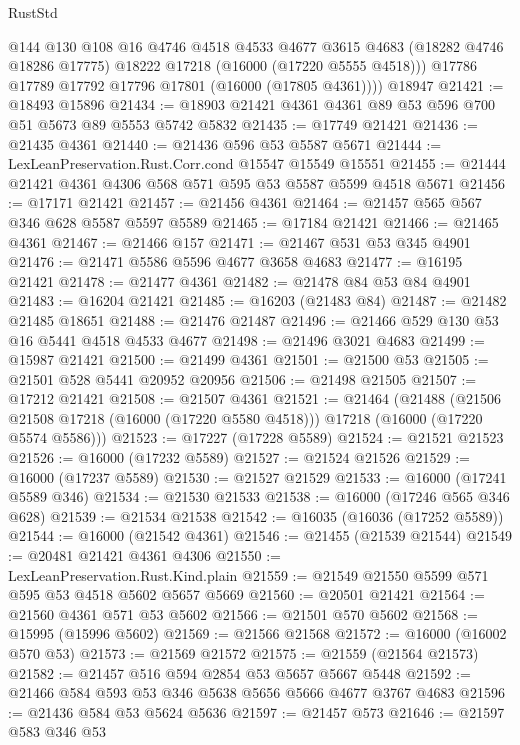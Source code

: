 \begin{lexlean}{RustStd}
\begin{coremodule}
          @144
          @130
          @108
          @16
          @4746
          @4518
          @4533
          @4677
          @3615
          @4683
          (@18282 @4746 @18286 @17775)
          @18222
          @17218
          (@16000 (@17220 @5555 @4518)))
        @17786
        @17789
        @17792
        @17796
        @17801
        (@16000 (@17805 @4361))))
    @18947
@21421 := @18493 @15896
@21434 := @18903 @21421 @4361 @4361 @89 @53 @596 @700 @51 @5673 @89 @5553 @5742 @5832
@21435 := @17749 @21421
@21436 := @21435 @4361
@21440 := @21436 @596 @53 @5587 @5671
@21444 := LexLeanPreservation.Rust.Corr.cond @15547 @15549 @15551
@21455 := @21444 @21421 @4361 @4306 @568 @571 @595 @53 @5587 @5599 @4518 @5671
@21456 := @17171 @21421
@21457 := @21456 @4361
@21464 := @21457 @565 @567 @346 @628 @5587 @5597 @5589
@21465 := @17184 @21421
@21466 := @21465 @4361
@21467 := @21466 @157
@21471 := @21467 @531 @53 @345 @4901
@21476 := @21471 @5586 @5596 @4677 @3658 @4683
@21477 := @16195 @21421
@21478 := @21477 @4361
@21482 := @21478 @84 @53 @84 @4901
@21483 := @16204 @21421
@21485 := @16203 (@21483 @84)
@21487 := @21482 @21485 @18651
@21488 := @21476 @21487
@21496 := @21466 @529 @130 @53 @16 @5441 @4518 @4533 @4677
@21498 := @21496 @3021 @4683
@21499 := @15987 @21421
@21500 := @21499 @4361
@21501 := @21500 @53
@21505 := @21501 @528 @5441 @20952 @20956
@21506 := @21498 @21505
@21507 := @17212 @21421
@21508 := @21507 @4361
@21521 := @21464
    (@21488
      (@21506 @21508 @17218 (@16000 (@17220 @5580 @4518)))
      @17218
      (@16000 (@17220 @5574 @5586)))
@21523 := @17227 (@17228 @5589)
@21524 := @21521 @21523
@21526 := @16000 (@17232 @5589)
@21527 := @21524 @21526
@21529 := @16000 (@17237 @5589)
@21530 := @21527 @21529
@21533 := @16000 (@17241 @5589 @346)
@21534 := @21530 @21533
@21538 := @16000 (@17246 @565 @346 @628)
@21539 := @21534 @21538
@21542 := @16035 (@16036 (@17252 @5589))
@21544 := @16000 (@21542 @4361)
@21546 := @21455 (@21539 @21544)
@21549 := @20481 @21421 @4361 @4306
@21550 := LexLeanPreservation.Rust.Kind.plain
@21559 := @21549 @21550 @5599 @571 @595 @53 @4518 @5602 @5657 @5669
@21560 := @20501 @21421
@21564 := @21560 @4361 @571 @53 @5602
@21566 := @21501 @570 @5602
@21568 := @15995 (@15996 @5602)
@21569 := @21566 @21568
@21572 := @16000 (@16002 @570 @53)
@21573 := @21569 @21572
@21575 := @21559 (@21564 @21573)
@21582 := @21457 @516 @594 @2854 @53 @5657 @5667 @5448
@21592 := @21466 @584 @593 @53 @346 @5638 @5656 @5666 @4677 @3767 @4683
@21596 := @21436 @584 @53 @5624 @5636
@21597 := @21457 @573
@21646 := @21597
    @583
    @346
    @53

\end{coremodule}
\end{lexlean}
